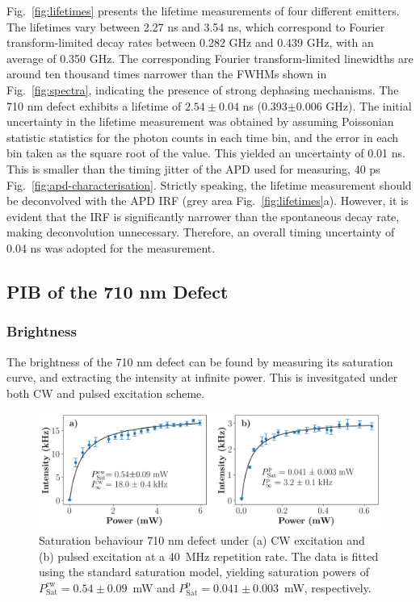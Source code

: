 Fig.~\ref{fig:lifetimes} presents the lifetime measurements of four different emitters. The lifetimes vary between 2.27 ns and 3.54 ns, which correspond to Fourier transform-limited decay rates between 0.282 GHz and 0.439 GHz, with an average of 0.350 GHz. The corresponding Fourier transform-limited linewidths are around ten thousand times narrower than the FWHMs shown in Fig.~\ref{fig:spectra}, indicating the presence of strong dephasing mechanisms. The 710 nm defect exhibits a lifetime of $2.54\pm0.04$ ns (0.393$\pm$0.006 GHz). The initial uncertainty in the lifetime measurement was obtained by assuming Poissonian statistic statistics for the photon counts in each time bin, and the error in each bin taken as the square root of the value. This yielded an uncertainty of 0.01 ns. This is smaller than the timing jitter of the APD used for measuring, 40 ps Fig.~\ref{fig:apd-characterisation}. Strictly speaking, the lifetime measurement should be deconvolved with the APD IRF (grey area Fig.~\ref{fig:lifetimes}a). However, it is evident that the IRF is significantly narrower than the spontaneous decay rate, making deconvolution unnecessary. Therefore, an overall timing uncertainty of 0.04 ns was adopted for the measurement.


\subsection{PIB of the 710 nm Defect}

\subsubsection{Brightness}

The brightness of the 710 nm defect can be found by measuring its saturation curve, and extracting the intensity at infinite power. This is invesitgated under both CW and pulsed excitation scheme.

\begin{figure}[h]
    \centering
    \includegraphics[width=1\linewidth]{Figures/SatCurves.png}
    \caption{Saturation behaviour 710 nm defect under (a) CW excitation and (b) pulsed excitation at a 40~MHz repetition rate. The data is fitted using the standard saturation model, yielding saturation powers of $P_{\text{Sat}}^{\text{cw}} = 0.54 \pm 0.09$~mW and $P_{\text{Sat}}^{\text{p}} = 0.041 \pm 0.003$~mW, respectively.}
    \label{fig:sat-curves}
\end{figure}

